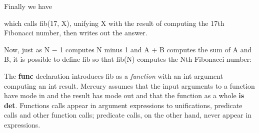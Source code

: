 \documentclass[a4paper,11pt,notitlepage,onecolumn]{book}
\begin{document}
Finally we have
\begin{small}

\begin{ptabular}
\nextline
{}
\nextline
{}
\nextline
{}
\nextline
{}
\nextline
\end{ptabular}

\end{small}
which calls \textsf{fib(17, X)}, unifying \textsf{X} with the result of computing the 17th
Fibonacci number, then writes out the answer.

Now, just as \textsf{N {\ensuremath{-}} 1} computes \textsf{N} minus 1 and \textsf{A {\ensuremath{+}} B} computes
the sum of \textsf{A} and \textsf{B}, it is possible to define \textsf{fib} so
that \textsf{fib(N)} computes the \textsf{N}th Fibonacci number:
\begin{small}

\begin{ptabular}
\nextline
\nextline
{}
\nextline
{}
\nextline
{}
\nextline
{}
\nextline
{}
\nextline
\end{ptabular}

\end{small}
The \textsf{\textbf{func}} declaration introduces \textsf{fib} as a \emph{function} with an \textsf{int}
argument computing an \textsf{int} result.  Mercury assumes that the input
arguments to a function have mode \textsf{in} and the result has mode \textsf{out} and
that the function as a whole \textsf{\textbf{is} \textbf{det}}.  Functions calls appear in argument
expressions to unifications, predicate calls and other function calls;
predicate calls, on the other hand, never appear in expressions.
\end{document}
